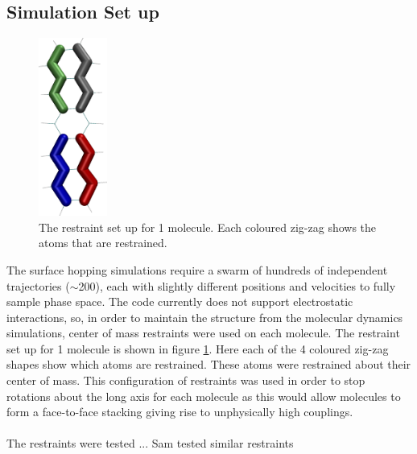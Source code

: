 \subsection{Simulation Set up}
\begin{figure}
	\vspace*{-0.7cm}
	\centering
	\includegraphics[width=0.2\textwidth]{./img/RestraintsPos.png}
	\caption{\label{fig:rest}The restraint set up for 1 molecule. Each coloured zig-zag shows the atoms that are restrained.}
\end{figure}
\vspace*{0.5cm}
The surface hopping simulations require a swarm of hundreds of independent trajectories ($\sim$200), each with slightly different positions and velocities to fully sample phase space. The code currently does not support electrostatic interactions, so, in order to maintain the structure from the molecular dynamics simulations, center of mass restraints were used on each molecule. The restraint set up for 1 molecule is shown in figure \ref{fig:rest}. Here each of the 4 coloured zig-zag shapes show which atoms are restrained. These atoms were restrained about their center of mass. This configuration of restraints was used in order to stop rotations about the long axis for each molecule as this would allow molecules to form a face-to-face stacking giving rise to unphysically high couplings.
\\\\
The restraints were tested ... Sam tested similar restraints
\\\\
